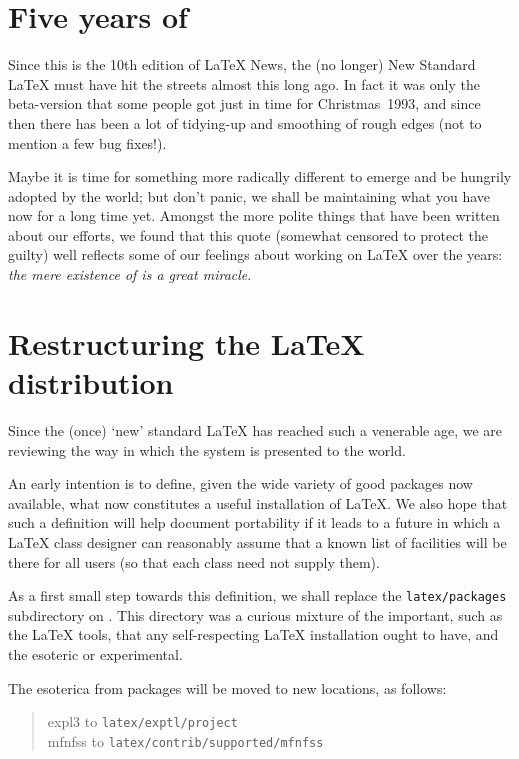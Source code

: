 \documentclass{ltnews}
\providecommand\file[1]{\texttt{#1}}
\begin{document}
\maketitle


\section{Five years of \LaTeXe}

Since  this is the 10th edition of \LaTeX{} News, the (no longer) New
Standard \LaTeX{} must have hit the streets almost this long ago.  In
fact it was only the beta-version that some people got just in time for
Christmas~1993, and since then there has been a lot of tidying-up and
smoothing of rough edges (not to mention a few bug fixes!).

Maybe it is time for something more radically different to emerge and
be hungrily adopted by the world; but don't panic, we shall be
maintaining what you have now for a long time yet.  Amongst the more
polite things that have been written about our efforts, we found that this
quote (somewhat censored to protect the guilty) well reflects some of
our feelings about working on \LaTeX{} over the years: \textit{the mere
existence of \LaTeXe{} is a great miracle}.


  \section{Restructuring the \LaTeX{} distribution}

  Since the (once) `new' standard \LaTeX{} has reached such a venerable
  age, we are reviewing the way in which the system is presented to the
  world.

  An early intention is to define, given the wide variety of good
  packages now available, what now constitutes a useful installation of
  \LaTeX{}. We also hope that such a definition will help document
  portability if it leads to a future in which a \LaTeX{} class
  designer can reasonably assume that a known list of
  facilities will be there for all users (so that each class
  need not supply them).

  As a first small step towards this definition, we shall replace the
  \file{latex/packages} subdirectory on \ctan{}.
  This directory was a curious mixture of the important, such as the
  \LaTeX{} \textsf{tools}, that any self-respecting \LaTeX{}
  installation ought to have, and the esoteric or experimental.

  The esoterica from \textsf{packages} will be moved to
  new locations, as follows:
  \begin{quote}
    \textsf{expl3}  to \file{latex/exptl/project}\\
    \textsf{mfnfss} to \file{latex/contrib/supported/mfnfss}
  \end{quote}
\end{document}
